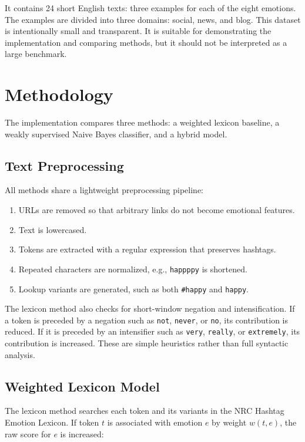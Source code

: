 \documentclass[11pt]{article}
\begin{document}
It contains 24 short English texts: three examples for each of the eight emotions. The examples are divided into three domains: social, news, and blog. This dataset is intentionally small and transparent. It is suitable for demonstrating the implementation and comparing methods, but it should not be interpreted as a large benchmark.

\section{Methodology}

The implementation compares three methods: a weighted lexicon baseline, a weakly supervised Naive Bayes classifier, and a hybrid model.

\subsection{Text Preprocessing}

All methods share a lightweight preprocessing pipeline:

\begin{enumerate}
    \item URLs are removed so that arbitrary links do not become emotional features.
    \item Text is lowercased.
    \item Tokens are extracted with a regular expression that preserves hashtags.
    \item Repeated characters are normalized, e.g., \texttt{happppy} is shortened.
    \item Lookup variants are generated, such as both \texttt{\#happy} and \texttt{happy}.
\end{enumerate}

The lexicon method also checks for short-window negation and intensification. If a token is preceded by a negation such as \texttt{not}, \texttt{never}, or \texttt{no}, its contribution is reduced. If it is preceded by an intensifier such as \texttt{very}, \texttt{really}, or \texttt{extremely}, its contribution is increased. These are simple heuristics rather than full syntactic analysis.

\subsection{Weighted Lexicon Model}

The lexicon method searches each token and its variants in the NRC Hashtag Emotion Lexicon. If token $t$ is associated with emotion $e$ by weight $w(t,e)$, the raw score for $e$ is increased:
\end{document}
